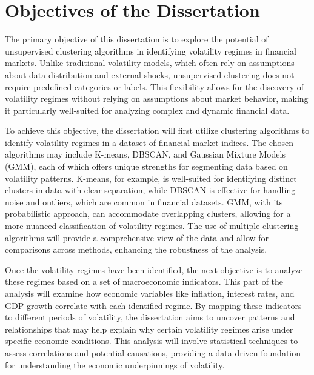 \section{Objectives of the Dissertation}

The primary objective of this dissertation is to explore the potential of unsupervised clustering algorithms in identifying volatility regimes in financial markets. Unlike traditional volatility models, which often rely on assumptions about data distribution and external shocks, unsupervised clustering does not require predefined categories or labels. This flexibility allows for the discovery of volatility regimes without relying on assumptions about market behavior, making it particularly well-suited for analyzing complex and dynamic financial data.

To achieve this objective, the dissertation will first utilize clustering algorithms to identify volatility regimes in a dataset of financial market indices. The chosen algorithms may include K-means, DBSCAN, and Gaussian Mixture Models (GMM), each of which offers unique strengths for segmenting data based on volatility patterns. K-means, for example, is well-suited for identifying distinct clusters in data with clear separation, while DBSCAN is effective for handling noise and outliers, which are common in financial datasets. GMM, with its probabilistic approach, can accommodate overlapping clusters, allowing for a more nuanced classification of volatility regimes. The use of multiple clustering algorithms will provide a comprehensive view of the data and allow for comparisons across methods, enhancing the robustness of the analysis.

Once the volatility regimes have been identified, the next objective is to analyze these regimes based on a set of macroeconomic indicators. This part of the analysis will examine how economic variables like inflation, interest rates, and GDP growth correlate with each identified regime. By mapping these indicators to different periods of volatility, the dissertation aims to uncover patterns and relationships that may help explain why certain volatility regimes arise under specific economic conditions. This analysis will involve statistical techniques to assess correlations and potential causations, providing a data-driven foundation for understanding the economic underpinnings of volatility.

